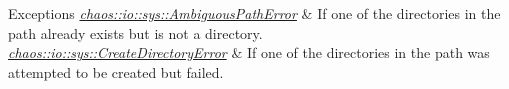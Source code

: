 \begin{DoxyExceptions}{Exceptions}
{\em \hyperlink{classchaos_1_1io_1_1sys_1_1_ambiguous_path_error}{chaos\-::io\-::sys\-::\-Ambiguous\-Path\-Error}} & If one of the directories in the path already exists but is not a directory. \\
\hline
{\em \hyperlink{classchaos_1_1io_1_1sys_1_1_create_directory_error}{chaos\-::io\-::sys\-::\-Create\-Directory\-Error}} & If one of the directories in the path was attempted to be created but failed. \\
\hline
\end{DoxyExceptions}
